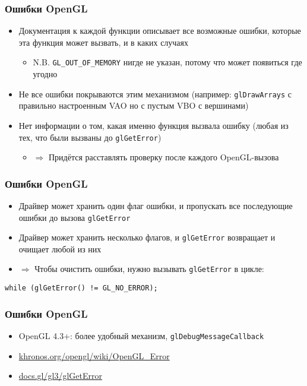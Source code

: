 \documentclass{beamer}
\begin{document}
\begin{frame}[fragile]
\frametitle{Ошибки OpenGL}
\begin{itemize}
\item Документация к каждой функции описывает все возможные ошибки, которые эта функция может вызвать, и в каких случаях
\pause
\begin{itemize}
\item N.B. \verb|GL_OUT_OF_MEMORY| нигде не указан, потому что может появиться где угодно
\end{itemize}
\pause
\item Не все ошибки покрываются этим механизмом (например: \verb|glDrawArrays| с правильно настроенным VAO но с пустым VBO с вершинами)
\pause
\item Нет информации о том, какая именно функция вызвала ошибку (любая из тех, что были вызваны до \verb|glGetError|)
\pause
\begin{itemize}
\item \begin{math}\Rightarrow\end{math} Придётся расставлять проверку после каждого OpenGL-вызова
\end{itemize}
\end{itemize}
\end{frame}

\begin{frame}[fragile]
\frametitle{Ошибки OpenGL}
\begin{itemize}
\item Драйвер может хранить один флаг ошибки, и пропускать все последующие ошибки до вызова \verb|glGetError|
\pause
\item Драйвер может хранить несколько флагов, и \verb|glGetError| возвращает и очищает любой из них
\pause
\item \begin{math}\Rightarrow\end{math} Чтобы очистить ошибки, нужно вызывать \verb|glGetError| в цикле:
\end{itemize}
\begin{verbatim}
while (glGetError() != GL_NO_ERROR);
\end{verbatim}
\end{frame}

\begin{frame}[fragile]
\frametitle{Ошибки OpenGL}
\begin{itemize}
\item OpenGL 4.3+: более удобный механизм, \verb|glDebugMessageCallback|
\pause
\item \href{https://www.khronos.org/opengl/wiki/OpenGL_Error}{khronos.org/opengl/wiki/OpenGL\_Error}
\item \href{https://docs.gl/gl3/glGetError}{docs.gl/gl3/glGetError}
\end{itemize}
\end{frame}
\end{document}

